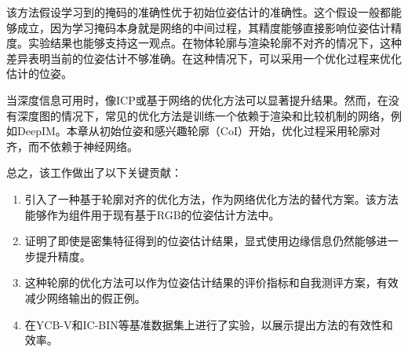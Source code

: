 该方法假设学习到的掩码的准确性优于初始位姿估计的准确性。这个假设一般都能够成立，因为学习掩码本身就是网络的中间过程，其精度能够直接影响位姿估计精度。实验结果也能够支持这一观点。在物体轮廓与渲染轮廓不对齐的情况下，这种差异表明当前的位姿估计不够准确。在这种情况下，可以采用一个优化过程来优化估计的位姿。

当深度信息可用时，像ICP或基于网络的优化方法\cite{lipson2022coupled}可以显著提升结果。然而，在没有深度图的情况下，常见的优化方法是训练一个依赖于渲染和比较机制的网络，例如DeepIM\cite{li2018deepim}。本章从初始位姿和感兴趣轮廓（CoI）开始，优化过程采用轮廓对齐，而不依赖于神经网络。

总之，该工作做出了以下关键贡献：

\begin{enumerate}
\item 引入了一种基于轮廓对齐的优化方法，作为网络优化方法的替代方案。该方法能够作为组件用于现有基于RGB的位姿估计方法中。
\item 证明了即使是密集特征得到的位姿估计结果，显式使用边缘信息仍然能够进一步提升精度。
\item 这种轮廓的优化方法可以作为位姿估计结果的评价指标和自我测评方案，有效减少网络输出的假正例。
\item 在YCB-V\cite{ycbv}和IC-BIN\cite{icbin}等基准数据集上进行了实验，以展示提出方法的有效性和效率。
\end{enumerate}
